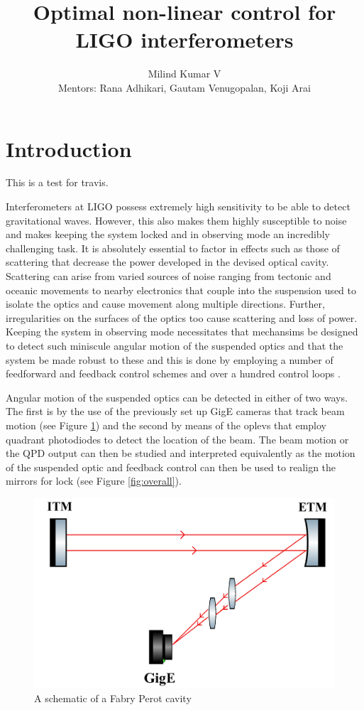 \documentclass[colorlinks=true,pdfstartview=FitV,linkcolor=blue,
            citecolor=red,urlcolor=magenta]{ligodoc}
\title{Optimal non-linear control for LIGO interferometers}
\author{Milind Kumar V \\ Mentors: Rana Adhikari, Gautam Venugopalan, Koji Arai}
\begin{document}
\section{Introduction}\label{introduction}

This is a test for travis.

Interferometers at LIGO possess extremely high sensitivity to be able to detect gravitational waves. However, this also makes them highly susceptible to noise and makes keeping the system locked and in observing mode an incredibly challenging task. It is absolutely essential to factor in effects such as those of scattering that decrease the power developed in the devised optical cavity. Scattering can arise from varied sources of noise ranging from tectonic and oceanic movements to nearby electronics that couple into the suspension used to isolate the optics and cause movement along multiple directions. Further, irregularities on the surfaces of the optics too cause scattering and loss of power. Keeping the system in observing mode necessitates that mechansims be designed to detect such miniscule angular motion of the suspended optics and that the system be made robust to these and this is done by employing a number of feedforward and feedback control schemes and over a hundred control loops \cite{adhikari2004sensitivity}.


Angular motion of the suspended optics can be detected in either of two ways. The first is by the use of the previously set up GigE cameras \cite{gige} that track beam motion (see Figure \ref{fig:gige}) and the second by means of the oplevs that employ quadrant photodiodes to detect the location of the beam. The beam motion or the QPD output can then be studied and interpreted equivalently as the motion of the suspended optic and feedback control can then be used to realign the mirrors for lock (see Figure \ref{fig:overall}).  

\begin{figure}[htbp]
\begin{center}
\includegraphics[width=.8\linewidth]{gige.png}
\caption{A schematic of a Fabry Perot cavity}
\label{fig:gige}
\end{center}
\end{figure} 
\end{document}
